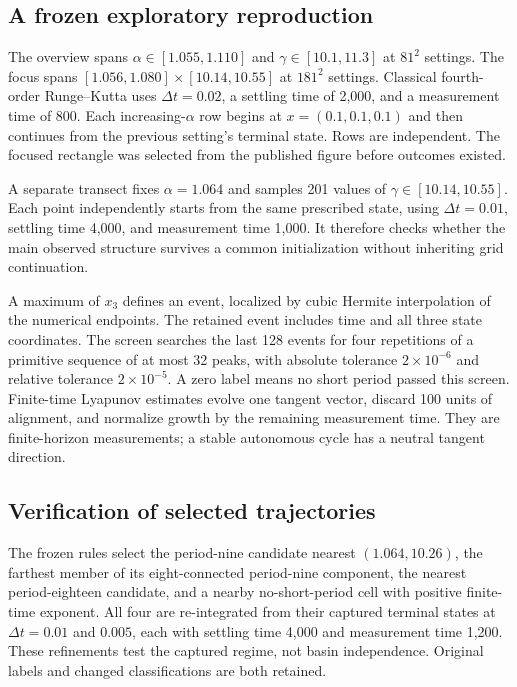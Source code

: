 \documentclass[11pt,letterpaper]{article}
\begin{document}
\subsection{A frozen exploratory reproduction}
The overview spans $\alpha\in[1.055,1.110]$ and $\gamma\in[10.1,11.3]$ at $81^2$ settings. The focus spans $[1.056,1.080]\times[10.14,10.55]$ at $181^2$ settings. Classical fourth-order Runge--Kutta uses $\Delta t=0.02$, a settling time of 2,000, and a measurement time of 800. Each increasing-$\alpha$ row begins at $x=(0.1,0.1,0.1)$ and then continues from the previous setting's terminal state. Rows are independent. The focused rectangle was selected from the published figure before outcomes existed.

A separate transect fixes $\alpha=1.064$ and samples 201 values of $\gamma\in[10.14,10.55]$. Each point independently starts from the same prescribed state, using $\Delta t=0.01$, settling time 4,000, and measurement time 1,000. It therefore checks whether the main observed structure survives a common initialization without inheriting grid continuation.

A maximum of $x_3$ defines an event, localized by cubic Hermite interpolation of the numerical endpoints. The retained event includes time and all three state coordinates. The screen searches the last 128 events for four repetitions of a primitive sequence of at most 32 peaks, with absolute tolerance $2\times10^{-6}$ and relative tolerance $2\times10^{-5}$. A zero label means no short period passed this screen. Finite-time Lyapunov estimates evolve one tangent vector, discard 100 units of alignment, and normalize growth by the remaining measurement time. They are finite-horizon measurements; a stable autonomous cycle has a neutral tangent direction.

\subsection{Verification of selected trajectories}
The frozen rules select the period-nine candidate nearest $(1.064,10.26)$, the farthest member of its eight-connected period-nine component, the nearest period-eighteen candidate, and a nearby no-short-period cell with positive finite-time exponent. All four are re-integrated from their captured terminal states at $\Delta t=0.01$ and $0.005$, each with settling time 4,000 and measurement time 1,200. These refinements test the captured regime, not basin independence. Original labels and changed classifications are both retained.
\end{document}
